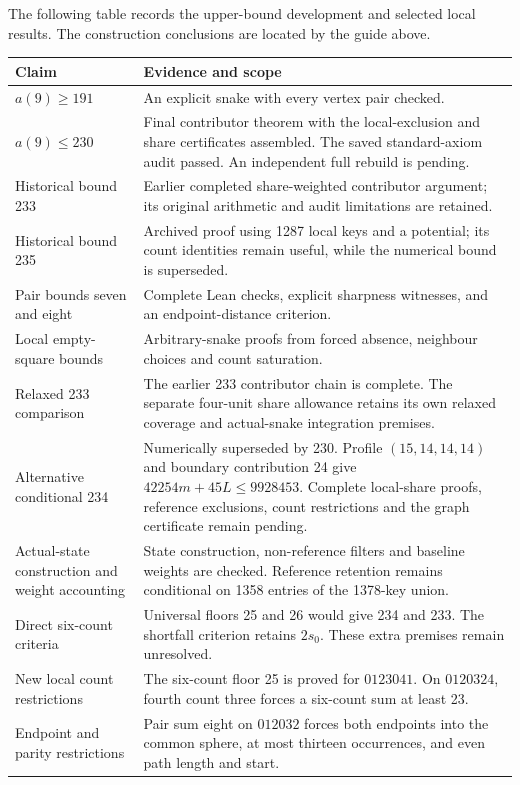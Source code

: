 \documentclass[11pt,a4paper]{article}
\theoremstyle{definition}
\theoremstyle{remark}
\begin{document}
The following table records the upper-bound development and selected
local results. The construction conclusions are located by the guide above.


\begin{center}
\begin{tabular}{p{}p{}}
\toprule
Claim & Evidence and scope\\\midrule
$a(9)\ge191$ & An explicit snake with every vertex pair checked.\\
$a(9)\le230$ & Final contributor theorem with the local-exclusion and share certificates assembled. The saved standard-axiom audit passed. An independent full rebuild is pending.\\
Historical bound 233 & Earlier completed share-weighted contributor argument; its original arithmetic and audit limitations are retained.\\
Historical bound 235 & Archived proof using 1287 local keys and a potential; its count identities remain useful, while the numerical bound is superseded.\\
Pair bounds seven and eight & Complete Lean checks, explicit sharpness witnesses, and an endpoint-distance criterion.\\
Local empty-square bounds & Arbitrary-snake proofs from forced absence, neighbour choices and count saturation.\\
Relaxed 233 comparison & The earlier 233 contributor chain is complete. The separate four-unit share allowance retains its own relaxed coverage and actual-snake integration premises.\\
Alternative conditional 234 & Numerically superseded by 230. Profile $(15,14,14,14)$ and boundary contribution 24 give $42254m+45L\le9928453$. Complete local-share proofs, reference exclusions, count restrictions and the graph certificate remain pending.\\
Actual-state construction and weight accounting & State construction, non-reference filters and baseline weights are checked. Reference retention remains conditional on 1358 entries of the 1378-key union.\\
Direct six-count criteria & Universal floors 25 and 26 would give 234 and 233. The shortfall criterion retains $2s_0$. These extra premises remain unresolved.\\
New local count restrictions & The six-count floor 25 is proved for $0123041$. On $0120324$, fourth count three forces a six-count sum at least 23.\\
Endpoint and parity restrictions & Pair sum eight on $012032$ forces both endpoints into the common sphere, at most thirteen occurrences, and even path length and start.\\

\end{tabular}
\end{center}
\end{document}
